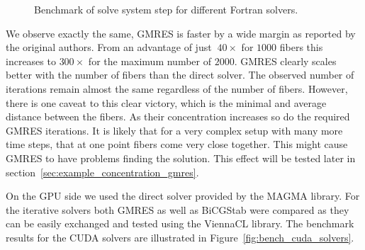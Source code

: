 \documentclass[a4paper,11pt]{kth-mag}
\begin{document}
\begin{figure}[!htbp]
  \centering
  \caption{Benchmark of solve system step for different Fortran solvers.}
  \label{fig:bench_openmp_solvers}
\end{figure}

We observe exactly the same, GMRES is faster by a wide margin as reported by the original authors\cite{Tornberg2006}. From an advantage of just $~40×$ for $1000$ fibers this increases to $300×$ for the maximum number of $2000$. GMRES clearly scales better with the number of fibers than the direct solver. The observed number of iterations remain almost the same regardless of the number of fibers. However, there is one caveat to this clear victory, which is the minimal and average distance between the fibers. As their concentration increases so do the required GMRES iterations. It is likely that for a very complex setup with many more time steps, that at one point fibers come very close together. This might cause GMRES to have problems finding the solution. This effect will be tested later in section~\ref{sec:example_concentration_gmres}.

On the GPU side we used the direct solver provided by the MAGMA library. For the iterative solvers both GMRES as well as BiCGStab were compared as they can be easily exchanged and tested using the ViennaCL library. The benchmark results for the CUDA solvers are illustrated in Figure~\ref{fig:bench_cuda_solvers}.
\end{document}

